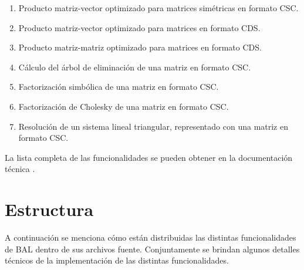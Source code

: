 \documentclass{cacic06}
\begin{document}
\begin{enumerate}
\begin{enumerate}
  \item Producto matriz-vector optimizado para matrices simétricas en formato CSC.
  \item Producto matriz-vector optimizado para matrices en formato CDS.
  \item Producto matriz-matriz optimizado para matrices en formato CDS.
  \item Cálculo del árbol de eliminación \cite{George} de una matriz en formato CSC.
  \item Factorización simbólica de una matriz en formato CSC.
  \item Factorización de Cholesky de una matriz en formato CSC.
  \item Resolución de un sistema lineal triangular, representado con una matriz en formato CSC.
 \end{enumerate}
\end{enumerate}
La lista completa de las funcionalidades se pueden obtener en la documentación técnica \cite{bal_tecnica}.

\section{Estructura}
\label{sec_estructura}
A continuación se menciona cómo están distribuidas las distintas funcionalidades de BAL dentro de sus archivos fuente. Conjuntamente se brindan algunos detalles técnicos de la implementación de las distintas funcionalidades.
\end{document}
